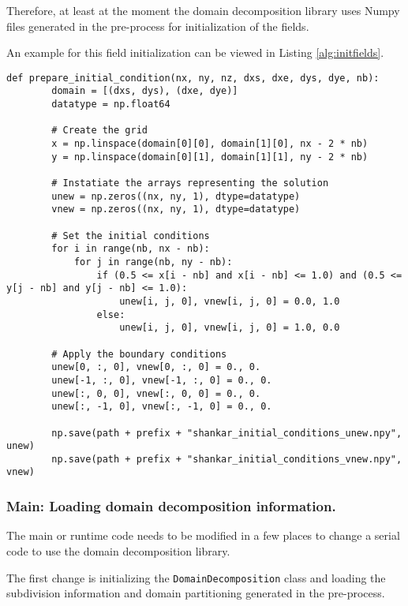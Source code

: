 Therefore, at least at the moment the domain decomposition library uses Numpy files generated in the pre-process for initialization of the fields.

An example for this field initialization can be viewed in Listing \ref{alg:initfields}.

\begin{lstlisting}[caption={Example code of the domain pre-process function to initialize to fields "unew" and "vnew"},captionpos=b, label={alg:initfields}, float, floatplacement=H]
def prepare_initial_condition(nx, ny, nz, dxs, dxe, dys, dye, nb):
        domain = [(dxs, dys), (dxe, dye)]
        datatype = np.float64

        # Create the grid
        x = np.linspace(domain[0][0], domain[1][0], nx - 2 * nb)
        y = np.linspace(domain[0][1], domain[1][1], ny - 2 * nb)

        # Instatiate the arrays representing the solution
        unew = np.zeros((nx, ny, 1), dtype=datatype)
        vnew = np.zeros((nx, ny, 1), dtype=datatype)

        # Set the initial conditions
        for i in range(nb, nx - nb):
            for j in range(nb, ny - nb):
                if (0.5 <= x[i - nb] and x[i - nb] <= 1.0) and (0.5 <= y[j - nb] and y[j - nb] <= 1.0):
                    unew[i, j, 0], vnew[i, j, 0] = 0.0, 1.0
                else:
                    unew[i, j, 0], vnew[i, j, 0] = 1.0, 0.0

        # Apply the boundary conditions
        unew[0, :, 0], vnew[0, :, 0] = 0., 0.
        unew[-1, :, 0], vnew[-1, :, 0] = 0., 0.
        unew[:, 0, 0], vnew[:, 0, 0] = 0., 0.
        unew[:, -1, 0], vnew[:, -1, 0] = 0., 0.

        np.save(path + prefix + "shankar_initial_conditions_unew.npy", unew)
        np.save(path + prefix + "shankar_initial_conditions_vnew.npy", vnew)
\end{lstlisting}

\subsubsection{Main: Loading domain decomposition information.}
The main or runtime code needs to be modified in a few places to change a serial code to use the domain decomposition library.

The first change is initializing the \texttt{DomainDecomposition} class and loading the subdivision information and domain partitioning generated in the pre-process.

